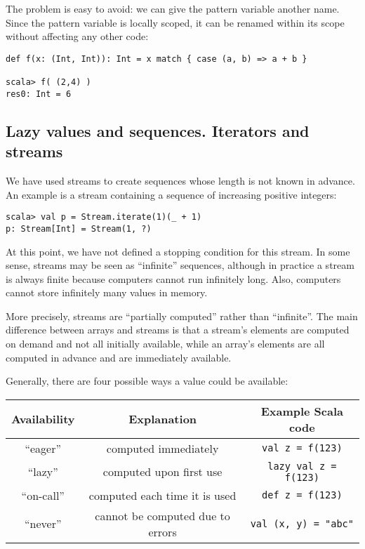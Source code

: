 The problem is easy to avoid: we can give the pattern variable another
name. Since the pattern variable is locally scoped, it can be renamed
within its scope without affecting any other code:
\begin{lstlisting}
def f(x: (Int, Int)): Int = x match { case (a, b) => a + b }

scala> f( (2,4) )
res0: Int = 6
\end{lstlisting}


\subsection{Lazy values and sequences. Iterators and streams\label{subsec:Lazy-values-iterators-and-streams}}

We have used streams to create sequences whose length is not known
in advance. An example is a stream containing a sequence of increasing
positive integers:
\begin{lstlisting}
scala> val p = Stream.iterate(1)(_ + 1)
p: Stream[Int] = Stream(1, ?)
\end{lstlisting}
At this point, we have not defined a stopping condition for this stream.
In some sense, streams may be seen as ``infinite'' sequences, although
in practice a stream is always finite because computers cannot run
infinitely long. Also, computers cannot store infinitely many values
in memory. 

More precisely, streams are ``partially computed'' rather than ``infinite''.
The main difference between arrays and streams is that a stream's
elements are computed on demand and not all initially available, while
an array's elements are all computed in advance and are immediately
available.

Generally, there are four possible ways a value could be available:
\begin{center}
\begin{tabular}{|c|c|c|}
\hline 
\textbf{\small{}Availability} & \textbf{\small{}Explanation} & \textbf{\small{}Example Scala code}\tabularnewline
\hline 
\hline 
{\small{}``eager\index{eager value}''} & {\small{}computed immediately} & {\small{}}\lstinline!val z = f(123)!\tabularnewline
\hline 
{\small{}``lazy''} & {\small{}computed upon first use} & {\small{}}\lstinline!lazy val z = f(123)!\tabularnewline
\hline 
{\small{}``on-call''} & {\small{}computed each time it is used} & {\small{}}\lstinline!def z = f(123)!\tabularnewline
\hline 
{\small{}``never''} & {\small{}cannot be computed due to errors} & {\small{}}\lstinline!val (x, y) = "abc" !\tabularnewline
\hline 
\end{tabular}
\par\end{center}

